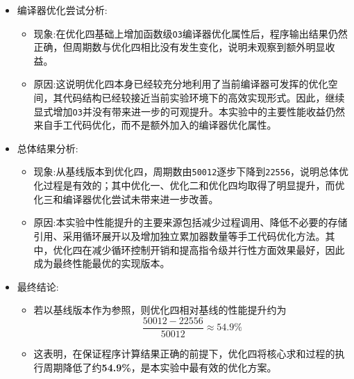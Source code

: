 \begin{itemize}
    \item 编译器优化尝试分析:
    \begin{itemize}
        \item 现象:在优化四基础上增加函数级\texttt{O3}编译器优化属性后，程序输出结果仍然正确，但周期数与优化四相比没有发生变化，说明未观察到额外明显收益。
        \item 原因:这说明优化四本身已经较充分地利用了当前编译器可发挥的优化空间，其代码结构已经较接近当前实验环境下的高效实现形式。因此，继续显式增加\texttt{O3}并没有带来进一步的可观提升。本实验中的主要性能收益仍然来自手工代码优化，而不是额外加入的编译器优化属性。
    \end{itemize}

    \item 总体结果分析:
    \begin{itemize}
        \item 现象:从基线版本到优化四，周期数由\texttt{50012}逐步下降到\texttt{22556}，说明总体优化过程是有效的；其中优化一、优化二和优化四均取得了明显提升，而优化三和编译器优化尝试未带来进一步改善。
        \item 原因:本实验中性能提升的主要来源包括减少过程调用、降低不必要的存储引用、采用循环展开以及增加独立累加器数量等手工代码优化方法。其中，优化四在减少循环控制开销和提高指令级并行性方面效果最好，因此成为最终性能最优的实现版本。
    \end{itemize}

    \item 最终结论:
    \begin{itemize}
        \item 若以基线版本作为参照，则优化四相对基线的性能提升约为
        \[
        \frac{50012 - 22556}{50012} \approx 54.9\%
        \]
        \item 这表明，在保证程序计算结果正确的前提下，优化四将核心求和过程的执行周期降低了约\textbf{54.9\%}，是本实验中最有效的优化方案。
    \end{itemize}

\end{itemize}